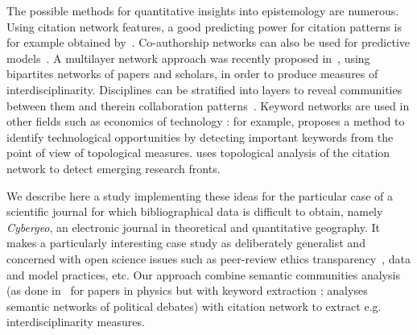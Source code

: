 


The possible methods for quantitative insights into epistemology are numerous. %
 Using citation network features, a good predicting power for citation patterns is for example obtained by~\cite{2013arXiv1310.8220N}. Co-authorship networks can also be used for predictive models~\cite{2014arXiv1402.7268S}. A multilayer network approach was recently proposed in~\cite{2016arXiv160106075O}, using bipartites networks of papers and scholars, in order to produce measures of interdisciplinarity. Disciplines can be stratified into layers to reveal communities between them and therein collaboration patterns~\cite{2015arXiv150601280B}. Keyword networks are used in other fields such as economics of technology : for example, \cite{choi2014patent} proposes a method to identify technological opportunities by detecting important keywords from the point of view of topological measures. \cite{shibata2008detecting} uses topological analysis of the citation network to detect emerging research fronts.


We describe here a study implementing these ideas for the particular case of a scientific journal for which bibliographical data is difficult to obtain, namely \textit{Cybergeo}, an electronic journal in theoretical and quantitative geography. It makes a particularly interesting case study as deliberately generalist and concerned with open science issues such as peer-review ethics transparency~\cite{10.1371/journal.pone.0147913}, data and model practices, etc. Our approach combine semantic communities analysis (as done in~\cite{2016arXiv160208451P} for papers in physics but with keyword extraction ; \cite{2015arXiv151003797G} analyses semantic networks of political debates) with citation network to extract e.g. interdisciplinarity measures.






